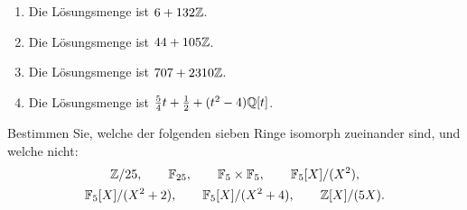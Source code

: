 \begin{solution}
  \begin{enumerate}
    \item
      Die Lösungsmenge ist $6 + 132 \mathbb{Z}$.
    \item
      Die Lösungsmenge ist $44 + 105 \mathbb{Z}$.
    \item
      Die Lösungsmenge ist $707 + 2310 \mathbb{Z}$.
    \item
      Die Lösungsmenge ist $\frac{5}{4}t + \frac{1}{2} + (t^2 - 4) \mathbb{Q}[t]$.
  \end{enumerate}
\end{solution}


 \begin{question}[subtitle = Isomorphiepuzzle]
  Bestimmen Sie, welche der folgenden sieben Ringe isomorph zueinander sind, und welche nicht:
  \begin{gather*}
    \mathbb{Z}/25,
    \qquad
    \mathbb{F}_{25},
    \qquad
    \mathbb{F}_5 \times \mathbb{F}_5,
    \qquad
    \mathbb{F}_5[X]/(X^2),
    \\
    \mathbb{F}_5[X]/(X^2+2),
    \qquad
    \mathbb{F}_5[X]/(X^2+4),
    \qquad
    \mathbb{Z}[X]/(5X).
  \end{gather*}
\end{question}


